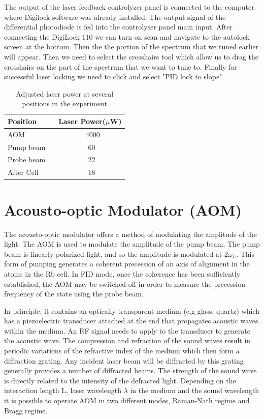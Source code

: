 The output of the laser feedback controlyzer panel is connected to the computer where Digilock software was already installed. The output signal of the differential photodiode is fed into the controlyser panel main input. After connecting the DigiLock 110 we can turn on scan and navigate to the autolock screen at the bottom. Then the the portion of the spectrum that we tuned earlier will appear. Then we need to select the crosshairs tool which allow us to drag the crosshairs on the part of the spectrum that we want to tune to. Finally for successful laser locking we need to click and select "PID lock to slope".
\begin{table}[h]
\centering
\begin{tabular}{|l | l|}
\hline

\textbf{ Position}    & \textbf{Laser Power($\mu$W)} \\
\hline

AOM ~&  ~ ~ ~ ~ ~4000  \\

Pump beam ~  &  ~ ~ ~ ~ ~ 60  \\

Probe beam ~  &  ~ ~ ~ ~ ~ 22  \\
After Cell ~ &  ~ ~ ~ ~ ~ 18   \\

\hline
\end{tabular}
\caption{Adjusted laser power at several positions in the experiment}
\end{table}
\section{Acousto-optic Modulator (AOM)}

The acousto-optic modulator offers a method of modulating the
amplitude of the light.
The AOM is used to modulate the amplitude of the pump beam. The pump beam is linearly polarized light, and so the amplitude
  is modulated at $2\omega_L$. This form of pumping generates a coherent precession of an axis of alignment in the atoms in the Rb cell. In FID mode, once the coherence has been sufficiently established, the AOM may be switched off in order to measure the precession frequency of the state using the probe beam.

 In principle, it contains an optically transparent medium (e.g glass, quartz) which has a piezoelectric transducer attached at the end that propagates acoustic waves within the medium. An RF signal needs to apply to the transducer to generate the acoustic wave. The compression and refraction of the sound waves result in periodic variations of the refractive index of the medium which then form a diffraction grating. Any incident laser beam will be diffracted by this grating generally provides a number of diffracted beams. The strength of the sound wave is directly related to the intensity of the defracted light. Depending on the interaction length L, laser wavelength $\lambda$ in the medium and the sound wavelength it is possible to operate AOM in two different modes, Raman-Nath regime and Bragg regime.

